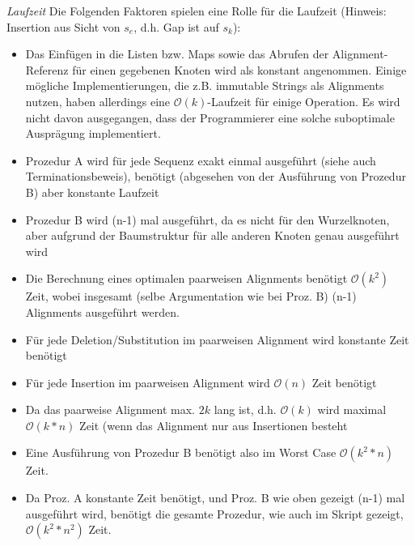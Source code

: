 \documentclass[a4paper,10pt,oneside,reqno]{scrartcl}
\begin{document}
\textit{Laufzeit}
Die Folgenden Faktoren spielen eine Rolle für die Laufzeit (Hinweis: Insertion aus Sicht von $s_e$, d.h. Gap ist auf $s_k$):
\begin{itemize}
 \item Das Einfügen in die Listen bzw. Maps sowie das Abrufen der Alignment-Referenz für einen gegebenen Knoten wird als konstant angenommen. Einige mögliche Implementierungen, die z.B. immutable Strings als Alignments nutzen, haben allerdings eine $\mathcal{O}(k)$-Laufzeit für einige Operation. Es wird nicht davon ausgegangen, dass der Programmierer eine solche suboptimale Ausprägung implementiert.
 \item Prozedur A wird für jede Sequenz exakt einmal ausgeführt (siehe auch Terminationsbeweis), benötigt (abgesehen von der Ausführung von Prozedur B) aber konstante Laufzeit
 \item Prozedur B wird (n-1) mal ausgeführt, da es nicht für den Wurzelknoten, aber aufgrund der Baumstruktur für alle anderen Knoten genau ausgeführt wird
 \item Die Berechnung eines optimalen paarweisen Alignments benötigt $\mathcal{O}(k^2)$ Zeit, wobei insgesamt (selbe Argumentation wie bei Proz. B) (n-1) Alignments ausgeführt werden.
 \item Für jede Deletion/Substitution im paarweisen Alignment wird konstante Zeit benötigt
 \item Für jede Insertion im paarweisen Alignment wird $\mathcal{O}(n)$ Zeit benötigt
 \item Da das paarweise Alignment max. $2k$ lang ist, d.h. $\mathcal{O}(k)$ wird maximal $\mathcal{O}(k*n)$ Zeit (wenn das Alignment nur aus Insertionen besteht
 \item Eine Ausführung von Prozedur B benötigt also im Worst Case $\mathcal{O}(k^2*n)$ Zeit.
 \item Da Proz. A konstante Zeit benötigt, und Proz. B wie oben gezeigt (n-1) mal ausgeführt wird, benötigt die gesamte Prozedur, wie auch im Skript gezeigt, $\mathcal{O}(k^2*n^2)$ Zeit.
\end{itemize}
\end{document}
